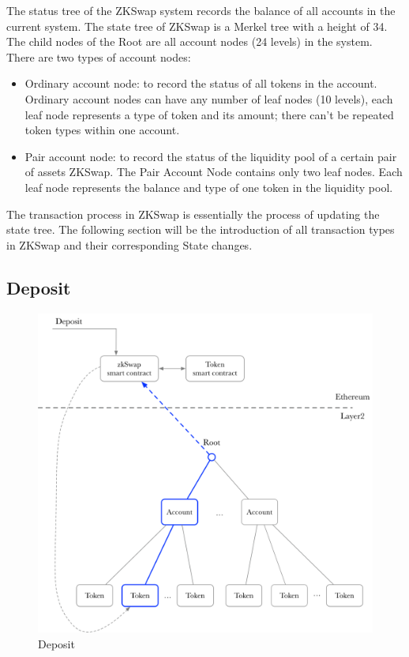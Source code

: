 \documentclass[]{template/llncs}
\begin{document}
The status tree of the ZKSwap system records the balance of all accounts in the current system. The state tree of ZKSwap is a Merkel tree with a height of 34. The child nodes of the Root are all account nodes (24 levels) in the system. There are two types of account nodes: 


\begin{itemize}
	\item Ordinary account node: to record the status of all tokens in the account. Ordinary account nodes can have any number of leaf nodes (10 levels), each leaf node represents a type of token and its amount; there can’t be repeated token types within one account.
	\item Pair account node: to record the status of the liquidity pool of a certain pair of assets ZKSwap. The Pair Account Node contains only two leaf nodes. Each leaf node represents the balance and type of one token in the liquidity pool.
\end{itemize}

The transaction process in ZKSwap is essentially the process of updating the state tree. The following section will be the introduction of all transaction types in ZKSwap and their corresponding State changes.

\subsection{Deposit}

\begin{figure}[htbp]
\centering
\includegraphics[width=0.9\columnwidth]{figure/deposit}
\caption{Deposit}
\label{fig:deposit}
\end{figure}
\end{document}
